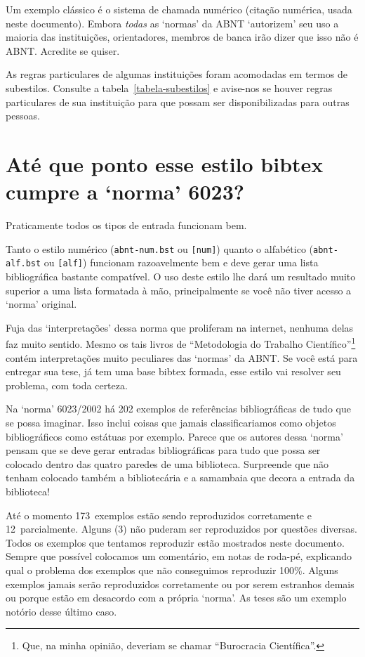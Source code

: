 \documentclass[espacosimples]{abnt}
\newcommand{\OKs}{173}
\newcommand{\quaseOKs}{12}
\newcommand{\nadaOK}{3}
\begin{document}
Um exemplo clássico é o sistema de chamada numérico (citação numérica, usada neste
documento). Embora \emph{todas} as `normas' da ABNT\cite{NBR6023:2002,NBR6023:2000,NBR10520:1988,NBR10520:2001}
`autorizem' seu uso a maioria das instituições, orientadores, membros de banca
irão dizer que isso não é ABNT. Acredite se quiser.

As regras particulares de algumas instituições foram acomodadas em termos de subestilos.
Consulte a tabela~\ref{tabela-subestilos} e avise-nos se houver regras
particulares de sua instituição para que possam ser disponibilizadas para outras
pessoas.

\section{Até que ponto esse estilo bibtex cumpre a `norma' 6023?}

Praticamente todos os tipos de entrada funcionam bem.

Tanto o estilo numérico ({\tt abnt-num.bst} ou {\tt [num]})
quanto o alfabético ({\tt abnt-alf.bst} ou {\tt [alf]})
funcionam razoavelmente bem e deve
gerar uma lista bibliográfica bastante compatível.
O uso deste estilo lhe dará um resultado muito superior
a uma lista formatada à mão, principalmente se você não tiver acesso
a `norma' original\cite{NBR6023:2002}.

Fuja das `interpretações' dessa norma que proliferam na internet, nenhuma
delas faz muito sentido. Mesmo os tais livros de ``Metodologia do Trabalho
Científico''\footnote{Que, na minha opinião, deveriam se chamar ``Burocracia Científica''.}
contém interpretações muito peculiares das `normas' da ABNT.
Se você está para entregar sua tese, já tem uma base bibtex formada,
esse estilo vai resolver seu problema, com toda certeza.

Na `norma' 6023/2002\cite{NBR6023:2002} há 202 exemplos de referências
bibliográficas de tudo que se possa imaginar. Isso inclui coisas que
jamais classificariamos como objetos bibliográficos como estátuas
por exemplo. Parece que os autores dessa `norma' pensam que se
deve gerar entradas bibliográficas para tudo que possa ser colocado
dentro das quatro paredes de uma biblioteca. Surpreende que não tenham
colocado também a bibliotecária e a samambaia que decora a entrada
da biblioteca!

Até o momento \OKs\ exemplos
estão sendo reproduzidos corretamente e \quaseOKs\ parcialmente.
Alguns (\nadaOK) não puderam ser reproduzidos por questões diversas.
Todos os
exemplos que tentamos reproduzir estão mostrados neste documento.
Sempre que possível colocamos um comentário, em notas de roda-pé,
explicando qual o problema dos exemplos que não conseguimos reproduzir 100\%.
Alguns exemplos jamais serão reproduzidos corretamente ou por serem estranhos
demais ou porque estão em desacordo com a própria `norma'.
As teses são um exemplo notório desse último caso.
\end{document}
